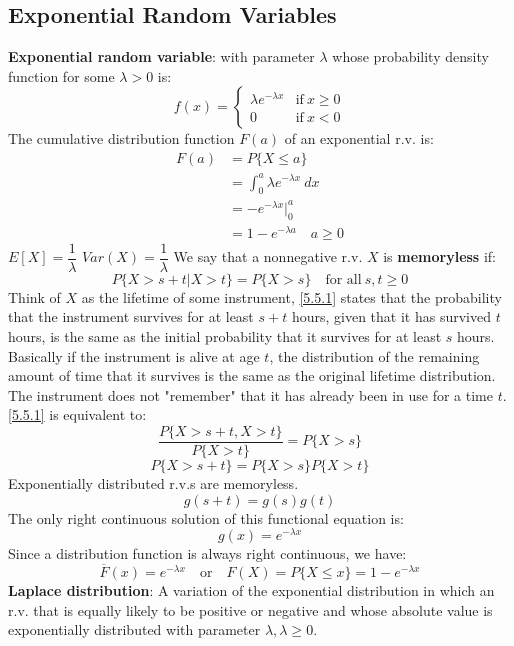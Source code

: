 \documentclass[openany]{book}
\numberwithin{equation}{section}
\begin{document}
\begin{flushleft}
\section{Exponential Random Variables}
\textbf{Exponential random variable}: with parameter $\lambda$ whose probability density function for some $\lambda>0$ is:
\[f(x)= \begin{cases} \lambda e^{-\lambda x} & \text{if} \ x\geq 0\\
0 & \text{if} \ x<0
\end{cases}
\]
The cumulative distribution function $F(a)$ of an exponential r.v. is:
\begin{align*}
F(a)&= P\{X\leq a \} \\
&= \int_{0}^{a}\lambda e^{-\lambda x} \ dx \\
&= -e^{-\lambda x} \big|_0^a\\
&= 1-e^{-\lambda a} \quad a \geq 0
\end{align*}
$E[X]=\dfrac{1}{\lambda}$\medbreak
$Var(X)=\dfrac{1}{\lambda}$\medbreak
We say that a nonnegative r.v. $X$ is \textbf{memoryless} if:
\begin{equation}
\label{5.5.1}
P\{X>s+t|X>t\}=P\{X>s\} \quad \text{for all} \ s, t\geq 0
\end{equation}
Think of $X$ as the lifetime of some instrument, \eqref{5.5.1} states that the probability that the instrument survives for at least $s+t$ hours, given that it has survived $t$ hours, is the same as the initial probability that it survives for at least $s$ hours. Basically if the instrument is alive at age $t$, the distribution of the remaining amount of time that it survives is the same as the original lifetime distribution. The instrument does not "remember" that it has already been in use for a time $t$.\medbreak
\eqref{5.5.1} is equivalent to:
\[\frac{P\{X>s+t,X>t \}}{P\{X>t\}}=P\{X>s\}
\]
\begin{equation}
\label{5.5.2}
P\{X>s+t\}=P\{X>s\}P\{X>t\}
\end{equation}
Exponentially distributed r.v.s are memoryless.
\[g(s+t)=g(s)g(t)
\]
The only right continuous solution of this functional equation is:
\begin{equation}
\label{5.5.3}
g(x)=e^{-\lambda x}
\end{equation}
Since a distribution function is always right continuous, we have:
\[\overline{F}(x)=e^{-\lambda x} \quad \text{or} \quad F(X)=P\{X\leq x\} = 1-e^{-\lambda x}
\]
\textbf{Laplace distribution}: A variation of the exponential distribution in which an r.v. that is equally likely to be positive or negative and whose absolute value is exponentially distributed with parameter $\lambda, \lambda \geq 0$. \medbreak


\end{flushleft}
\end{document}
